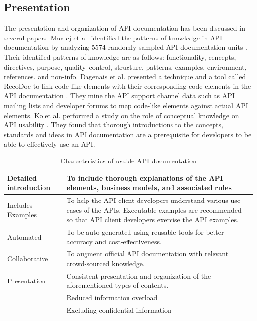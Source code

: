 \documentclass[11pt,oneside]{book}
\begin{document}
\subsection{Presentation} %
\label{sub:presentation}


The presentation and organization of API documentation has been discussed in several papers. Maalej et al. identified the patterns of knowledge in API documentation by analyzing 5574 randomly sampled API documentation units \cite{maalej2013patterns}. Their identified patterns of knowledge are as follows: functionality, concepts, directives, purpose, quality, control, structure, patterns, examples, environment, references, and non-info. Dagenais et al. presented a technique and a tool called RecoDoc to link code-like elements with their corresponding code elements in the API documentation \cite{dagenais2012recovering}. They mine the API support channel data such as API mailing lists and developer forums to map code-like elements against actual API elements. Ko et al. performed a study on the role of conceptual knowledge on API usability \cite{ko2011role}. They found that thorough introductions to the concepts, standards and ideas in API documentation are a prerequisite for developers to be able to effectively use an API.

\begin{table}[!tbh]
  \caption{Characteristics of usable API documentation}
  \label{table:good_apis}
\begin{tabular}{|p{1.5in} | p{3in}|}
\hline
Detailed introduction &
To include thorough explanations of the API elements, business models, and associated rules \\
\hline
Includes Examples &
To help the API client developers understand various use-cases of the APIs. Executable examples are recommended so that API client developers exercise the API examples. \\
\hline
Automated &
To be auto-generated using reusable tools for better accuracy and cost-effectiveness. \\
\hline
Collaborative &
To augment official API documentation with relevant crowd-sourced knowledge. \\
\hline
Presentation &
Consistent presentation and organization of the aforementioned types of contents. \\
& Reduced information overload\\
& Excluding confidential information\\
\hline
\end{tabular}
\end{table}
\end{document}

